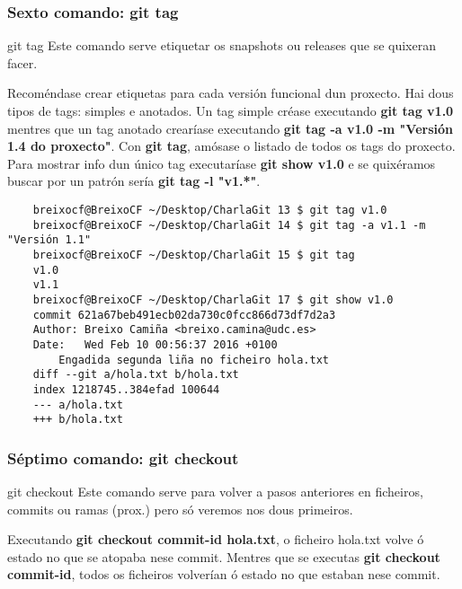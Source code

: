 \begin{frame}[fragile]
  \frametitle{Sexto comando: git tag}
  \begin{block}{git tag}
    Este comando serve etiquetar os snapshots ou releases que se quixeran facer.
  \end{block}
  \tiny
  Recoméndase crear etiquetas para cada versión funcional dun proxecto. Hai dous tipos de tags: simples e anotados. Un tag simple créase executando \textbf{git tag v1.0} mentres que un tag anotado crearíase executando \textbf{git tag -a v1.0 -m "Versión 1.4 do proxecto"}. Con \textbf{git tag}, amósase o listado de todos os tags do proxecto. Para mostrar info dun único tag executaríase \textbf{git show v1.0} e se quixéramos buscar por un patrón sería \textbf{git tag -l "v1.*"}.
  \tiny 
\begin{verbatim}
	breixocf@BreixoCF ~/Desktop/CharlaGit 13 $ git tag v1.0
	breixocf@BreixoCF ~/Desktop/CharlaGit 14 $ git tag -a v1.1 -m "Versión 1.1"
	breixocf@BreixoCF ~/Desktop/CharlaGit 15 $ git tag 
	v1.0
	v1.1
	breixocf@BreixoCF ~/Desktop/CharlaGit 17 $ git show v1.0 
	commit 621a67beb491ecb02da730c0fcc866d73df7d2a3
	Author: Breixo Camiña <breixo.camina@udc.es>
	Date:   Wed Feb 10 00:56:37 2016 +0100
	    Engadida segunda liña no ficheiro hola.txt
	diff --git a/hola.txt b/hola.txt
	index 1218745..384efad 100644
	--- a/hola.txt
	+++ b/hola.txt
\end{verbatim}
  \tiny
\end{frame}

\begin{frame}
  \frametitle{Séptimo comando: git checkout}
  \begin{block}{git checkout}
    Este comando serve para volver a pasos anteriores en ficheiros, commits ou ramas (prox.) pero só veremos nos dous primeiros.
  \end{block}
  \normalsize
  Executando \textbf{git checkout commit-id hola.txt}, o ficheiro hola.txt volve ó estado no que se atopaba nese commit. Mentres que se executas \textbf{git checkout commit-id}, todos os ficheiros volverían ó estado no que estaban nese commit.
  \tiny 
\end{frame}


